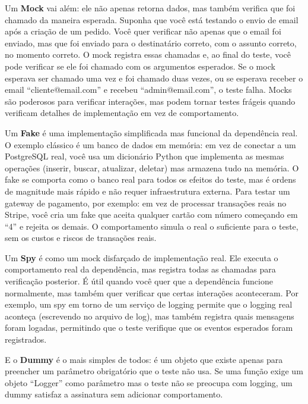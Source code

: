 Um \textbf{Mock} vai além: ele não apenas retorna dados, mas também verifica
que foi chamado da maneira esperada. Suponha que você está testando o envio de
email após a criação de um pedido. Você quer verificar não apenas que o email
foi enviado, mas que foi enviado para o destinatário correto, com o assunto
correto, no momento correto. O mock registra essas chamadas e, ao final do
teste, você pode verificar se ele foi chamado com os argumentos esperados. Se
o mock esperava ser chamado uma vez e foi chamado duas vezes, ou se esperava
receber o email ``cliente@email.com'' e recebeu ``admin@email.com'', o teste
falha. Mocks são poderosos para verificar interações, mas podem tornar testes
frágeis quando verificam detalhes de implementação em vez de comportamento.

Um \textbf{Fake} é uma implementação simplificada mas funcional da dependência
real. O exemplo clássico é um banco de dados em memória: em vez de conectar a
um PostgreSQL real, você usa um dicionário Python que implementa as mesmas
operações (inserir, buscar, atualizar, deletar) mas armazena tudo na memória.
O fake se comporta como o banco real para todos os efeitos do teste, mas é
ordens de magnitude mais rápido e não requer infraestrutura externa. Para
testar um gateway de pagamento, por exemplo: em vez de processar transações reais no Stripe,
você cria um fake que aceita qualquer cartão com número começando em ``4'' e
rejeita os demais. O comportamento simula o real o suficiente para o teste,
sem os custos e riscos de transações reais.

Um \textbf{Spy} é como um mock disfarçado de implementação real. Ele executa o
comportamento real da dependência, mas registra todas as chamadas para
verificação posterior. É útil quando você quer que a dependência funcione
normalmente, mas também quer verificar que certas interações aconteceram. Por
exemplo, um spy em torno de um serviço de logging permite que o logging real
aconteça (escrevendo no arquivo de log), mas também registra quais mensagens
foram logadas, permitindo que o teste verifique que os eventos esperados foram
registrados.

E o \textbf{Dummy} é o mais simples de todos: é um objeto que existe apenas
para preencher um parâmetro obrigatório que o teste não usa. Se uma função
exige um objeto ``Logger'' como parâmetro mas o teste não se preocupa com
logging, um dummy satisfaz a assinatura sem adicionar comportamento.

